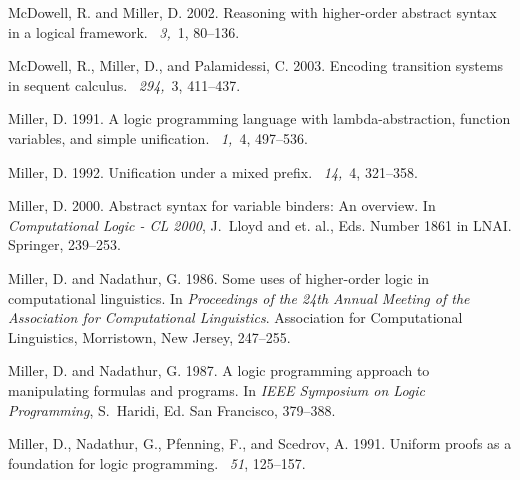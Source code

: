 \documentclass{acmtrans2m}
\begin{document}
\begin{thebibliography}{}
{\sc McDowell, R.} {\sc and} {\sc Miller, D.} 2002.
\newblock Reasoning with higher-order abstract syntax in a logical framework.
~{\em 3,\/}~1, 80--136.

{\sc McDowell, R.}, {\sc Miller, D.}, {\sc and} {\sc Palamidessi, C.} 2003.
\newblock Encoding transition systems in sequent calculus.
~{\em 294,\/}~3, 411--437.

{\sc Miller, D.} 1991.
\newblock A logic programming language with lambda-abstraction, function
  variables, and simple unification.
~{\em 1,\/}~4, 497--536.

{\sc Miller, D.} 1992.
\newblock Unification under a mixed prefix.
~{\em 14,\/}~4, 321--358.

{\sc Miller, D.} 2000.
\newblock Abstract syntax for variable binders: An overview.
\newblock In {\em Computational Logic - {CL} 2000}, {J.~Lloyd} {and} {{et.
  al.}}, Eds. Number 1861 in LNAI. Springer, 239--253.

{\sc Miller, D.} {\sc and} {\sc Nadathur, G.} 1986.
\newblock Some uses of higher-order logic in computational linguistics.
\newblock In {\em Proceedings of the 24th Annual Meeting of the Association for
  Computational Linguistics}. Association for Computational Linguistics,
  Morristown, New Jersey, 247--255.

{\sc Miller, D.} {\sc and} {\sc Nadathur, G.} 1987.
\newblock A logic programming approach to manipulating formulas and programs.
\newblock In {\em IEEE Symposium on Logic Programming}, {S.~Haridi}, Ed. San
  Francisco, 379--388.

{\sc Miller, D.}, {\sc Nadathur, G.}, {\sc Pfenning, F.}, {\sc and} {\sc
  Scedrov, A.} 1991.
\newblock Uniform proofs as a foundation for logic programming.
~{\em 51}, 125--157.


\end{thebibliography}
\end{document}
